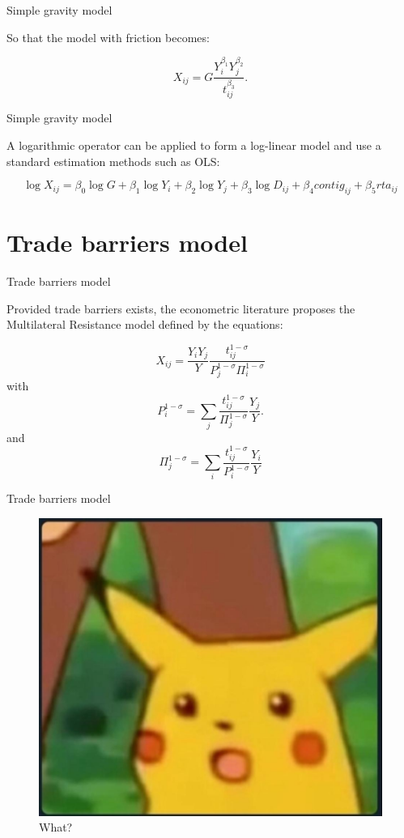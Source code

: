\documentclass[ignorenonframetext,compress,aspectratio=169]{beamer}
\begin{document}
\begin{frame}{Simple gravity model}

So that the model with friction becomes:

\[
X_{ij}=G\frac{Y_{i}^{\beta_{1}}Y_{j}^{\beta_{2}}}{t_{ij}^{\beta_{3}}}.
\]

\end{frame}

\begin{frame}{Simple gravity model}

A logarithmic operator can be applied to form a log-linear model and use
a standard estimation methods such as OLS:

\[
\log X_{ij}=\beta_{0}\log G +\beta_{1}\log Y_{i}+\beta_{2}\log Y_{j}+\beta_{3}\log D_{ij}+\beta_{4}contig_{ij}+\beta_{5}rta_{ij}
\]

\end{frame}

\section{Trade barriers model}\label{trade-barriers-model}

\begin{frame}{Trade barriers model}

Provided trade barriers exists, the econometric literature proposes the
Multilateral Resistance model defined by the equations:

\[
X_{ij}=\frac{Y_{i}Y_{j}}{Y}\frac{t_{ij}^{1-\sigma}}{P_{j}^{1-\sigma}\Pi_{i}^{1-\sigma}}
\] with \[
P_{i}^{1-\sigma}=\sum_{j}\frac{t_{ij}^{1-\sigma}}{\Pi_{j}^{1-\sigma}}\frac{Y_{j}}{Y}.
\] and \[
\Pi_{j}^{1-\sigma}=\sum_{i}\frac{t_{ij}^{1-\sigma}}{P_{i}^{1-\sigma}}\frac{Y_{i}}{Y}
\]

\end{frame}

\begin{frame}{Trade barriers model}

\begin{figure}
\centering
\includegraphics{pikachu.jpg}
\caption{What?}
\end{figure}

\end{frame}
\end{document}
